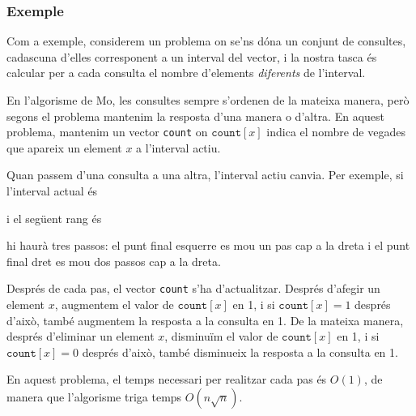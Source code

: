 \subsubsection*{Exemple}

Com a exemple, considerem un problema on se'ns dóna un conjunt de
consultes, cadascuna d'elles corresponent a un interval del vector,
i la nostra tasca és calcular per a cada consulta el nombre d'elements
\emph{diferents} de l'interval.

En l'algorisme de Mo, les consultes sempre s'ordenen de la mateixa
manera, però segons el problema mantenim la resposta d'una manera o d'altra.
En aquest problema, mantenim un vector \texttt{count}
on $\texttt{count}[x]$ indica el nombre de vegades que apareix un
element $x$ a l'interval actiu.

Quan passem d'una consulta a una altra, l'interval actiu canvia. Per
exemple, si l'interval actual és
\begin{center}
\end{center}
i el següent rang és
\begin{center}
\end{center}
hi haurà tres passos: el punt final esquerre es mou un pas cap a la
dreta i el punt final dret es mou dos passos cap a la dreta.

Després de cada pas, el vector \texttt{count} s'ha
d'actualitzar. Després d'afegir un element $x$, augmentem el valor de
$\texttt{count}[x]$ en 1, i si $\texttt{count}[x]=1$ després d'això,
també augmentem la resposta a la consulta en 1. De la mateixa manera,
després d'eliminar un element $x$, disminuïm el valor de
$\texttt{count}[x]$ en 1, i si $\texttt{count}[x]=0$ després d'això,
també disminueix la resposta a la consulta en 1.

En aquest problema, el temps necessari per realitzar cada pas és
$O(1)$, de manera que l'algorisme triga temps $O(n \sqrt n)$.

